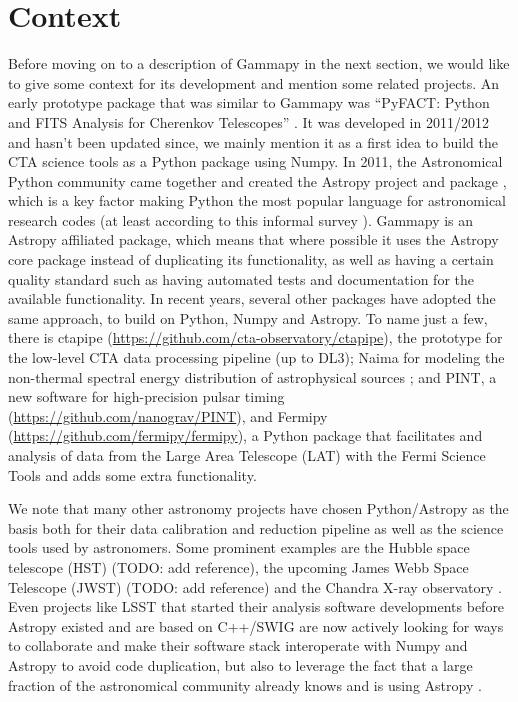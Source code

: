 \documentclass{PoS}
\newcommand{\url}[1]{\href{#1}{#1}}
\begin{document}
\section{Context}
\label{sec:context}

Before moving on to a description of Gammapy in the next section, we would like
to give some context for its development and mention some related projects. An
early prototype package that was similar to Gammapy was ``PyFACT: Python and
FITS Analysis for Cherenkov Telescopes'' \cite{pyfact}. It was developed in
2011/2012 and hasn't been updated since, we mainly mention it as a first 
idea to build the CTA science tools as a Python package using Numpy. In 2011,
the Astronomical Python community came together and created the Astropy project
and package \cite{astropy}, which is a key factor making Python the most popular
language for astronomical research codes (at least according to this informal
survey \cite{momcheva2015}). Gammapy is an Astropy affiliated package, which
means that where possible it uses the Astropy core package instead of
duplicating its functionality, as well as having a certain quality standard
such as having automated tests and documentation for the available
functionality. In recent years, several other packages have adopted the same
approach, to build on Python, Numpy and Astropy. To name just a few, there is
ctapipe (\url{https://github.com/cta-observatory/ctapipe}), the prototype for
the low-level CTA data processing pipeline (up to DL3); Naima for modeling the
non-thermal spectral energy distribution of astrophysical sources \cite{naima};
and PINT, a new software for high-precision pulsar timing
(\url{https://github.com/nanograv/PINT}), and Fermipy
(\url{https://github.com/fermipy/fermipy}), a Python package that facilitates
and analysis of data from the Large Area Telescope (LAT) with the Fermi Science
Tools and adds some extra functionality.

We note that many other astronomy projects have chosen Python/Astropy as the
basis both for their data calibration and reduction pipeline as well as the
science tools used by astronomers. Some prominent examples are the Hubble space
telescope (HST) (TODO: add reference), the upcoming James Webb Space Telescope
(JWST) (TODO: add reference) and the Chandra X-ray observatory \cite{chandra,
sherpa2001}. Even projects like LSST that started their analysis software
developments before Astropy existed and are based on C++/SWIG are now actively
looking for ways to collaborate and make their software stack interoperate with
Numpy and Astropy to avoid code duplication, but also to leverage the fact that
a large fraction of the astronomical community already knows and is using
Astropy \cite{lsst}.
\end{document}

